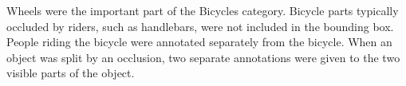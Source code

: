 Wheels were the important part of the Bicycles category.
Bicycle parts typically occluded by riders, such as handlebars, were not included in the bounding box.
People riding the bicycle were annotated separately from the bicycle. When an
object was split by an occlusion, two separate annotations were given to the two
visible parts of the object.
%
\begin{figure}[!h]
    \centering
     \quad
     \quad
    \label{fig:th-image}
\end{figure}